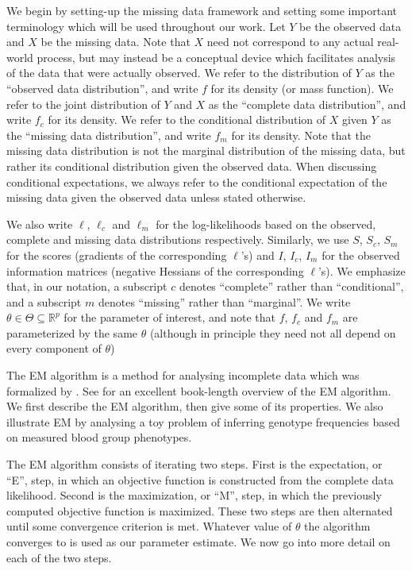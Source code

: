 \documentclass[ss]{imsart}
\theoremstyle{plain}
\theoremstyle{definition}
\theoremstyle{remark}
\newcommand{\bR}{\mathbb{R}}
\begin{document}
We begin by setting-up the missing data framework and setting some important terminology which will be used throughout our work. Let $Y$ be the observed data and $X$ be the missing data. Note that $X$ need not correspond to any actual real-world process, but may instead be a conceptual device which facilitates analysis of the data that were actually observed. We refer to the distribution of $Y$ as the ``observed data distribution'', and write $f$ for its density (or mass function). We refer to the joint distribution of $Y$ and $X$ as the ``complete data distribution'', and write $f_c$ for its density. We refer to the conditional distribution of $X$ given $Y$ as the ``missing data distribution'', and write $f_m$ for its density. Note that the missing data distribution is not the marginal distribution of the missing data, but rather its conditional distribution given the observed data. When discussing conditional expectations, we always refer to the conditional expectation of the missing data given the observed data unless stated otherwise.

We also write $\ell$, $\ell_c$ and $\ell_m$ for the log-likelihoods based on the observed, complete and missing data distributions respectively. Similarly, we use $S$, $S_c$, $S_m$ for the scores (gradients of the corresponding $\ell$'s) and $I$, $I_c$, $I_m$ for the observed information matrices (negative Hessians of the corresponding $\ell$'s). We emphasize that, in our notation, a subscript $c$ denotes ``complete'' rather than ``conditional'', and a subscript $m$ denotes ``missing'' rather than ``marginal''. We write $\theta \in \Theta \subseteq \bR^p$ for the parameter of interest, and note that $f$, $f_c$ and $f_m$ are parameterized by the same $\theta$ (although in principle they need not all depend on every component of $\theta$)

The EM algorithm is a method for analysing incomplete data which was formalized by \citet{Dem77}. See \citet{McL08} for an excellent book-length overview of the EM algorithm. We first describe the EM algorithm, then give some of its properties. We also illustrate EM by analysing a toy problem of inferring genotype frequencies based on measured blood group phenotypes.

The EM algorithm consists of iterating two steps. First is the expectation, or ``E'', step, in which an objective function is constructed from the complete data likelihood. Second is the maximization, or ``M'', step, in which the previously computed objective function is maximized. These two steps are then alternated until some convergence criterion is met. Whatever value of $\theta$ the algorithm converges to is used as our parameter estimate. We now go into more detail on each of the two steps.
\end{document}

